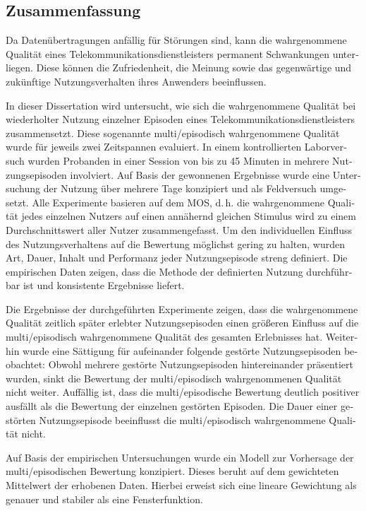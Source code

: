 \begin{otherlanguage}{ngerman}
\chapter*{Zusammenfassung}
Da Datenübertragungen anfällig für Störungen sind, kann die wahrgenommene Qualität eines Telekommunikationsdienstleisters permanent Schwankungen unterliegen.
Diese können die Zufriedenheit, die Meinung sowie das gegenwärtige und zukünftige Nutzungsverhalten ihres Anwenders beeinflussen. 

In dieser Dissertation wird untersucht, wie sich die wahrgenommene Qualität bei wiederholter Nutzung einzelner Episoden eines Telekommunikationsdienstleisters zusammensetzt.
Diese sogenannte multi\-/episodisch wahrgenommene Qualität wurde für jeweils zwei Zeitspannen evaluiert.
In einem kontrollierten Laborversuch wurden Probanden in einer Session von bis zu 45 Minuten in mehrere Nutzungsepisoden involviert.
Auf Basis der gewonnenen Ergebnisse wurde eine Untersuchung der Nutzung über mehrere Tage konzipiert und als Feldversuch umgesetzt.
Alle Experimente basieren auf dem \acf{MOS}, d.\,h. die wahrgenommene Qualität jedes einzelnen Nutzers auf einen annähernd gleichen Stimulus wird zu einem Durchschnittswert aller Nutzer zusammengefasst. 
Um den individuellen Einfluss des Nutzungsverhaltens auf die Bewertung möglichst gering zu halten, wurden Art, Dauer, Inhalt und Performanz jeder Nutzungsepisode streng definiert.
Die empirischen Daten zeigen, dass die Methode der definierten Nutzung durchführbar ist und konsistente Ergebnisse liefert.

Die Ergebnisse der durchgeführten Experimente zeigen, dass die wahrgenommene Qualität zeitlich später erlebter Nutzungsepisoden einen größeren Einfluss auf die multi\-/episodisch wahrgenommene Qualität des gesamten Erlebnisses hat.
Weiterhin wurde eine Sättigung für aufeinander folgende gestörte Nutzungsepisoden beobachtet: Obwohl mehrere gestörte Nutzungsepisoden hintereinander präsentiert wurden, sinkt die Bewertung der multi\-/episodisch wahrgenommenen Qualität nicht weiter.
Auffällig ist, dass die multi\-/episodische Bewertung deutlich positiver ausfällt als die Bewertung der einzelnen gestörten Episoden.
Die Dauer einer gestörten Nutzungsepisode beeinflusst die multi\-/episodisch wahrgenommene Qualität nicht.

Auf Basis der empirischen Untersuchungen wurde ein Modell zur Vorhersage der multi\-/episodischen Bewertung konzipiert.
Dieses beruht auf dem gewichteten Mittelwert der erhobenen Daten.
Hierbei erweist sich eine lineare Gewichtung als genauer und stabiler als eine Fensterfunktion. 

\end{otherlanguage}
